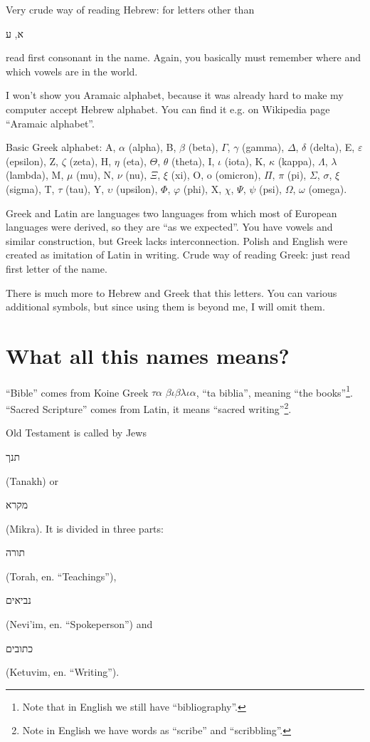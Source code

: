 \documentclass[a4paper,11pt]{article}
\begin{document}
Very crude way of reading Hebrew: for letters other than
\begin{hebrew} א, ע‎ \end{hebrew} read first consonant in the name. Again,
you basically must remember where and which vowels are in the world.

I won't show you Aramaic alphabet, because it was already hard to make my
computer accept Hebrew alphabet. You can find it e.g. on Wikipedia page
``Aramaic alphabet''.

Basic Greek alphabet: A, $\alpha$ (alpha), B, $\beta$ (beta), $\Gamma$, $\gamma$ (gamma),
$\Delta$, $\delta$ (delta), E, $\varepsilon$ (epsilon), Z, $\zeta$ (zeta), H, $\eta$ (eta), $\Theta$, $\theta$
(theta), I, $\iota$ (iota), K, $\kappa$ (kappa), $\Lambda$, $\lambda$ (lambda), M, $\mu$ (mu), N,
$\nu$ (nu), $\Xi$, $\xi$ (xi), O, o (omicron), $\Pi$, $\pi$ (pi), $\Sigma$, $\sigma$, $\xi$
(sigma), T, $\tau$ (tau), Y, $\upsilon$ (upsilon), $\Phi$, $\varphi$ (phi), X, $\chi$, $\Psi$, $\psi$
(psi), $\Omega$, $\omega$ (omega).

Greek and Latin are languages two languages from which most of European
languages were derived, so they are ``as we expected''. You have vowels and
similar construction, but Greek lacks interconnection. Polish and English
were created as imitation of Latin in writing. Crude way of reading Greek:
just read first letter of the name.

There is much more to Hebrew and Greek that this letters. You can various
additional symbols, but since using them is beyond me, I will omit them.










\section{What all this names means?} %



``Bible'' comes from Koine Greek $\tau \alpha$ $\beta \iota \beta \lambda \iota \alpha$, ``ta biblia'', meaning
``the books''\footnote{Note that in English we still have
  ``bibliography''.}. ``Sacred Scripture'' comes from Latin, it means
``sacred writing''\footnote{Note in English we have words as ``scribe'' and
  ``scribbling''.}.

Old Testament is called by Jews \begin{hebrew} תנך \end{hebrew} (Tanakh) or
\begin{hebrew} מקרא \end{hebrew} (Mikra). It is divided in three parts:
\begin{hebrew} תורה \end{hebrew} (Torah, en. ``Teachings''),
\begin{hebrew} נביאים \end{hebrew} (Nevi'im, en. ``Spokeperson'') and
\begin{hebrew} כתובים \end{hebrew} (Ketuvim, en. ``Writing'').
\end{document}
